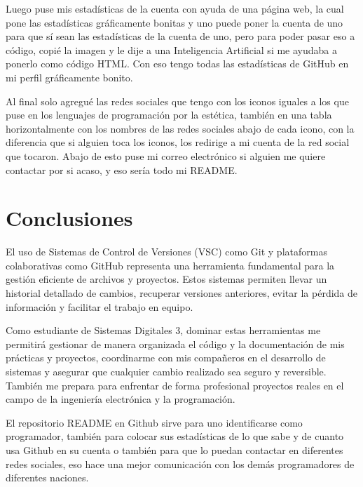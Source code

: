 \documentclass[conference]{IEEEtran}
\begin{document}
Luego puse mis estadísticas de la cuenta con ayuda de una página web, la cual pone las estadísticas gráficamente bonitas y uno puede poner la cuenta de uno para que sí sean las estadísticas de la cuenta de uno, pero para poder pasar eso a código, copié la imagen y le dije a una Inteligencia Artificial si me ayudaba a ponerlo como código HTML. Con eso tengo todas las estadísticas de GitHub en mi perfil gráficamente bonito.

Al final solo agregué las redes sociales que tengo con los iconos iguales a los que puse en los lenguajes de programación por la estética, también en una tabla horizontalmente con los nombres de las redes sociales abajo de cada icono, con la diferencia que si alguien toca los iconos, los redirige a mi cuenta de la red social que tocaron. Abajo de esto puse mi correo electrónico si alguien me quiere contactar por si acaso, y eso sería todo mi README.

\section{Conclusiones}
El uso de Sistemas de Control de Versiones (VSC) como Git y plataformas colaborativas como GitHub representa una herramienta fundamental para la gestión eficiente de archivos y proyectos. Estos sistemas permiten llevar un historial detallado de cambios, recuperar versiones anteriores, evitar la pérdida de información y facilitar el trabajo en equipo.

Como estudiante de Sistemas Digitales 3, dominar estas herramientas me permitirá gestionar de manera organizada el código y la documentación de mis prácticas y proyectos, coordinarme con mis compañeros en el desarrollo de sistemas y asegurar que cualquier cambio realizado sea seguro y reversible. También me prepara para enfrentar de forma profesional proyectos reales en el campo de la ingeniería electrónica y la programación.

El repositorio README en Github sirve para uno identificarse como programador, también para colocar sus estadísticas de lo que sabe y de cuanto usa Github en su cuenta o también para que lo puedan contactar en diferentes redes sociales, eso hace una mejor comunicación con los demás programadores de diferentes naciones.
\end{document}
